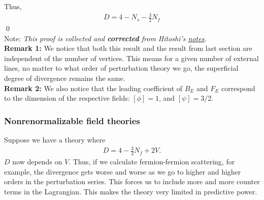 \documentclass{book}
\theoremstyle{definition}
\newcommand{\f}[2]{\frac{#1}{#2}}
\begin{document}
Thus, 
\begin{align}
\boxed{D = 4 - N_s - \f{3}{2}N_f}
\end{align}\qed\\







Note: \textit{This proof is collected and \textbf{corrected} from Hitoshi's \href{http://hitoshi.berkeley.edu/230A/Yukawa.pdf}{\underline{notes}}. }\\





\textbf{Remark 1:} We notice that both this result and the result from last section are independent of the number of vertices. This means for a given number of external lines, no matter to what order of perturbation theory we go, the superficial degree of divergence remains the same. \\

\textbf{Remark 2:} We also notice that the leading coefficient of $B_E$ and $F_E$ correspond to the dimension of the respective fields: $[\phi] = 1$, and $[\psi] = 3/2$.\\








\subsubsection{Nonrenormalizable field theories}



Suppose we have a theory where
\begin{align}
D = 4 - \f{3}{2}N_f + 2V.
\end{align}
$D$ now depends on $V$. Thus, if we calculate fermion-fermion scattering, for example, the divergence gets worse and worse as we go to higher and higher orders in the perturbation series. This forces us to include more and more counter terms in the Lagrangian. This makes the theory very limited in predictive power. 















\newpage
\end{document}
